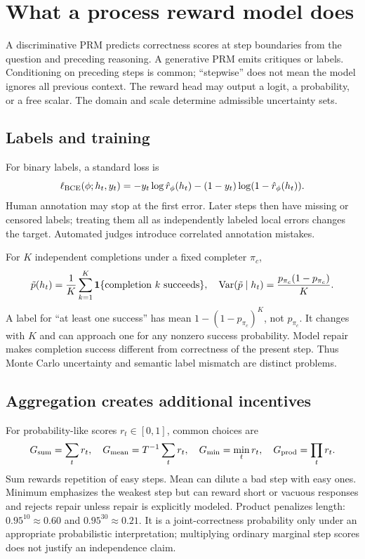 \section{What a process reward model does}
A discriminative PRM predicts correctness scores at step boundaries from the
question and preceding reasoning. A generative PRM emits critiques or labels.
Conditioning on preceding steps is common; ``stepwise'' does not mean the model
ignores all previous context. The reward head may output a logit, a probability,
or a free scalar. The domain and scale determine admissible uncertainty sets.

\subsection{Labels and training}
For binary labels, a standard loss is
\[
 \ell_{\rm BCE}(\phi;h_t,y_t)
 =-y_t\log\hat r_\phi(h_t)-(1-y_t)\log(1-\hat r_\phi(h_t)).
\]
Human annotation may stop at the first error. Later steps then have missing or
censored labels; treating them all as independently labeled local errors changes
the target. Automated judges introduce correlated annotation mistakes.

For $K$ independent completions under a fixed completer $\pi_c$,
\[
 \tilde p(h_t)=\frac1K\sum_{k=1}^K\mathbf{1}\{\text{completion }k\text{ succeeds}\},
 \quad \operatorname{Var}(\tilde p\mid h_t)=\frac{p_{\pi_c}(1-p_{\pi_c})}{K}.
\]
A label for ``at least one success'' has mean $1-(1-p_{\pi_c})^K$, not
$p_{\pi_c}$. It changes with $K$ and can approach one for any nonzero success
probability. Model repair makes completion success different from correctness
of the present step. Thus Monte Carlo uncertainty and semantic label mismatch
are distinct problems.

\subsection{Aggregation creates additional incentives}
For probability-like scores $r_t\in[0,1]$, common choices are
\[
 G_{\rm sum}=\sum_t r_t,\quad G_{\rm mean}=T^{-1}\sum_t r_t,
 \quad G_{\rm min}=\min_t r_t,\quad G_{\rm prod}=\prod_t r_t.
\]
Sum rewards repetition of easy steps. Mean can dilute a bad step with easy ones.
Minimum emphasizes the weakest step but can reward short or vacuous responses
and rejects repair unless repair is explicitly modeled. Product penalizes length:
$0.95^{10}\approx0.60$ and $0.95^{30}\approx0.21$. It is a joint-correctness
probability only under an appropriate probabilistic interpretation; multiplying
ordinary marginal step scores does not justify an independence claim.

